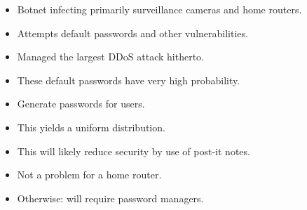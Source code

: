 \begin{frame}
  \begin{example}
    \begin{itemize}
      \item Botnet infecting primarily surveillance cameras and home routers.
      \item Attempts default passwords and other vulnerabilities.
      \item Managed the largest \ac{DDoS} attack hitherto.
    \end{itemize}
  \end{example}

  \begin{remark}
    \begin{itemize}
      \item These default passwords have very high probability.
    \end{itemize}
  \end{remark}
\end{frame}

%
%
%

\begin{frame}
  \begin{idea}
    \begin{itemize}
      \item Generate passwords for users.
      \item This yields a uniform distribution.
    \end{itemize}
  \end{idea}

  \begin{remark}[Usability]
    \begin{itemize}
      \item This will likely reduce security by use of post-it notes.
      \item Not a problem for a home router.
      \item Otherwise: will require password managers.
    \end{itemize}
  \end{remark}
\end{frame}

